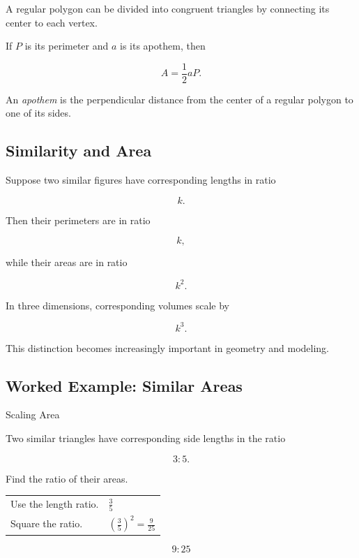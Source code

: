 A regular polygon can be divided into congruent triangles by connecting its
center to each vertex.

If \(P\) is its perimeter and \(a\) is its apothem, then

\[ \boxed{A=\frac12aP.} \]

An \emph{apothem} is the perpendicular distance from the center of a regular
polygon to one of its sides.

\subsection{Similarity and Area}
\label{subsec:similarity-area}

Suppose two similar figures have corresponding lengths in ratio

\[ k. \]

Then their perimeters are in ratio

\[ k, \]

while their areas are in ratio

\[ \boxed{k^2.} \]

In three dimensions, corresponding volumes scale by

\[ k^3. \]

This distinction becomes increasingly important in geometry and modeling.

\subsection{Worked Example: Similar Areas}
\label{subsec:worked-similar-areas}

\begin{workedexamplebox}{Scaling Area}

Two similar triangles have corresponding side lengths in the ratio

\[ 3:5. \]

Find the ratio of their areas.

\begin{tabularx}{\textwidth}{@{}>{\raggedright\arraybackslash}p{}X@{}}
Use the length ratio. & \(\frac35\)\\
Square the ratio. & \(\left(\frac35\right)^2=\frac9{25}\)
\end{tabularx}

\begin{answerbox}
\[ \boxed{9:25} \]
\end{answerbox}
\end{workedexamplebox}

